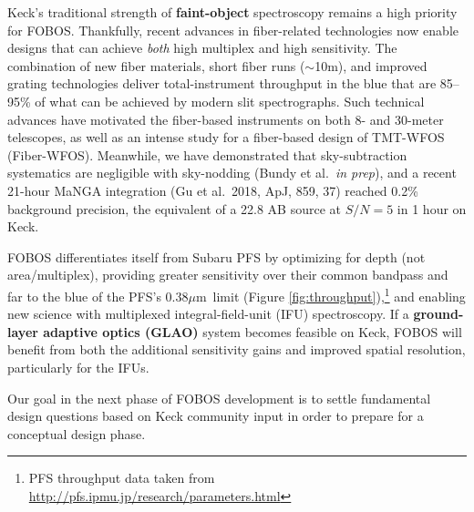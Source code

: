 \documentclass[11pt,letterpaper]{article}
\newcommand\micron{\mbox{$\mu$m}}%
\begin{document}
 Keck's traditional
strength of {\bf faint-object} spectroscopy remains a high priority for
FOBOS.  Thankfully, recent advances in fiber-related technologies now
enable designs that can achieve \emph{both} high multiplex and high
sensitivity.  The combination of new fiber materials, short fiber runs
($\sim$10m), and improved grating technologies deliver total-instrument
throughput in the blue that are 85--95\% of what can be achieved by
modern slit spectrographs.  Such technical advances have motivated the
fiber-based instruments on both 8- and 30-meter telescopes, as well as
an intense study for a fiber-based design of TMT-WFOS (Fiber-WFOS).
Meanwhile, we have demonstrated that sky-subtraction systematics are
negligible with sky-nodding (Bundy et al.\ {\it in prep}), and a recent
21-hour MaNGA integration (Gu et al.\ 2018, ApJ, 859, 37) reached 0.2\%
background precision, the equivalent of a 22.8 AB source at $S/N = 5$ in
1 hour on Keck.

FOBOS differentiates itself
from Subaru PFS by optimizing for depth (not area/multiplex), providing
greater sensitivity over their common bandpass and far to the blue of 
the PFS's 0.38\micron\ limit (Figure
\ref{fig:throughput}),\footnote{PFS throughput data taken from
\url{http://pfs.ipmu.jp/research/parameters.html}} and enabling new
science with multiplexed integral-field-unit (IFU) spectroscopy.  If a
\textbf{ground-layer adaptive optics (GLAO)} system becomes feasible on
Keck, FOBOS will benefit from both the additional sensitivity gains and
improved spatial resolution, particularly for the IFUs.  \smallskip


\noindent Our goal in the next phase of FOBOS development is to settle
fundamental design questions based on Keck community input in order to
prepare for a conceptual design phase.
\end{document}
